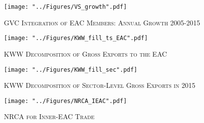 \documentclass[a4paper]{article}
\begin{document}
\begin{figure}[h!]
\centering
\caption{\label{fig:VSgr}\textsc{GVC Integration of EAC Members: Annual Growth 2005-2015}}
\texttt{[image: "../Figures/VS\_growth".pdf]} %
\end{figure}
\FloatBarrier


\begin{figure}[h!] \vspace{-1cm}
\centering
\caption{\label{fig:KWW_fill_ts_EAC}\textsc{KWW Decomposition of Gross Exports to the EAC}}
\texttt{[image: "../Figures/KWW\_fill\_ts\_EAC".pdf]} %
\vspace{-0.8cm}
\end{figure}
\FloatBarrier

\begin{figure}[h!] \vspace{-0.1cm}
\centering
\caption{\label{fig:KWW_fill_sec}\textsc{KWW Decomposition of Sector-Level Gross Exports in 2015}}
\texttt{[image: "../Figures/KWW\_fill\_sec".pdf]} %
\vspace{-1.5cm}
\end{figure}
\FloatBarrier


\begin{figure}[h!]
\centering
\caption{\label{fig:NRCA_IEAC}\textsc{NRCA for Inner-EAC Trade}}
\texttt{[image: "../Figures/NRCA\_IEAC".pdf]} %
\end{figure}
\FloatBarrier
\end{document}
